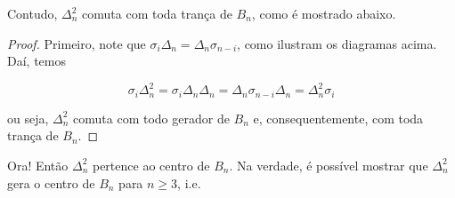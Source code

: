 \documentclass[a4paper,portuguese,11pt,twoside, leqno]{book}
\makeatletter
\newcounter{braid}
\newcounter{strands}
\def\cross{%
	\@ifnextchar^{\message{Got sup}\cross@sup}{\cross@sub}}
\def\cross@sup^#1_#2{\render@cross{#2}{#1}}
\def\cross@sub_#1{\@ifnextchar^{\cross@@sub{#1}}{\render@cross{#1}{1}}}
\def\cross@@sub#1^#2{\render@cross{#1}{#2}}
\def\render@cross#1#2{
	\def\strand{#1}
	\def\crossing{#2}
	\pgfmathsetmacro{\cross@y}{-\value{braid}*\braid@h}
	\pgfmathtruncatemacro{\nextstrand}{#1+1}
	\foreach \thread in {1,...,\value{strands}}
	{
		\pgfmathsetmacro{\strand@x}{\thread * \braid@w}
		\ifnum\thread=\strand
		\pgfmathsetmacro{\over@x}{\strand * \braid@w + .5*(1 - \crossing) * \braid@w}
		\pgfmathsetmacro{\under@x}{\strand * \braid@w + .5*(1 + \crossing) * \braid@w}
		\draw[braid] \pgfkeysvalueof{/tikz/braid start} +(\under@x pt,\cross@y pt) to[out=-90,in=90] +(\over@x pt,\cross@y pt -\braid@h);
		\draw[braid] \pgfkeysvalueof{/tikz/braid start} +(\over@x pt,\cross@y pt) to[out=-90,in=90] +(\under@x pt,\cross@y pt -\braid@h);
		\else
		\ifnum\thread=\nextstrand
		\else
		\draw[braid] \pgfkeysvalueof{/tikz/braid start} ++(\strand@x pt,\cross@y pt) -- ++(0,-\braid@h);
		\fi
		\fi
	}
	\stepcounter{braid}
}
\newcommand{\braid}[2][]{%
	\begingroup
	\pgfkeys{/tikz/strands=2}
	\tikzset{#1}
	\pgfkeysgetvalue{/tikz/braid width}{\braid@w}
	\pgfkeysgetvalue{/tikz/braid height}{\braid@h}
	\setcounter{braid}{0}
	\let\sigma=\cross
	#2
	\endgroup
}
\theoremstyle{definition}
\makeatother
\begin{document}
	
	
	\par\vspace{0.3cm} Contudo, $\Delta_n^2$ comuta com toda trança de $B_n$, como é mostrado abaixo.
	
	\begin{proof}
		
		
		
		Primeiro, note que $\sigma_i\Delta_n = \Delta_n\sigma_{n-i}$, como ilustram os diagramas acima. Daí, temos
		
		\begin{equation*}
		\sigma_i\Delta_n^2 = \sigma_i\Delta_n\Delta_n = \Delta_n\sigma_{n-i}\Delta_n = \Delta_n^2\sigma_i
		\end{equation*}
		
		\par\vspace{0.3cm} ou seja, $\Delta_n^2$ comuta com todo gerador de $B_n$ e, consequentemente, com toda trança de $B_n$.
		
		\par\vspace{0.3cm} 
		
	\end{proof}
	
	\par\vspace{0.3cm} Ora! Então $\Delta_n^2$ pertence ao centro de $B_n$. Na verdade, é possível mostrar que $\Delta_n^2$ gera o centro de $B_n$ para $n\geq 3$, i.e.
	
\end{document}
